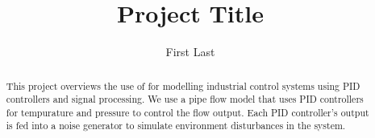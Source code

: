 \documentclass[a4paper,titlepage]{article}
\begin{document}
\title{Project Title}
\author{First Last}
\maketitle

\begin{abstract}
	This project overviews the use of \Labview for modelling industrial control
	systems using PID controllers and signal processing. We use a pipe flow model
	that uses PID controllers for tempurature and pressure to control the flow
	output. Each PID controller's output is fed into a noise generator to simulate
	environment disturbances in the system.
\end{abstract}

\tableofcontents
\listoftables
\listoffigures

\pagebreak




\end{document}
